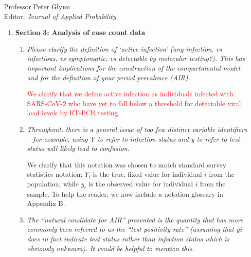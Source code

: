 \documentclass[11pt]{letter} %
\begin{document}
\begin{letter}{Professor
	Peter Glynn\\
	Editor, {\em Journal of Applied Probability}}
\begin{enumerate}
\begin{enumerate}
	The difference in age breakdown of sampled individuals in the Facebook / CMU survey, now referred to as Delphi's COVID-19 Trends and Impact Survey (CTIS), from the general population is acknowledged in Section 5.  Table 1 now presents estimates of all demographic and covariate information using Delphi CTIS's weighting procedure.  These weights are used in computing probabilities of selection as shown in Equation (4.2) in Section 4.1.1. Estimates for 'Fever' and 'Household + Case' only use data collected between April 25th and 29th to match the timing of the random survey.  Note that individual-level racial demographics were not provided by CTIS due to data privacy concerns and there was no corresponding question on percent of tests from individuals with a prior positive test.

	\vspace{5mm}
\end{enumerate}
\item {\bf Section 3: Analysis of case count data}
\begin{enumerate}
	\item {\it Please clarify the definition of ‘active infection’ (any infection, vs infectious, vs symptomatic, vs detectable by molecular testing?). This has important implications for the construction of the compartmental model and for the definition of your period prevalence (AIR).}
	\vspace{5mm}

	\textcolor{red}{We clarify that we define active infection as individuals infected with SARS-CoV-2 who have yet to fall below a threshold for detectable viral load levels by RT-PCR testing.}
	\vspace{5mm}
	\item {\it Throughout, there is a general issue of too few distinct variable identifiers – for example, using Y to refer to infection status and y to refer to test status will likely lead to confusion.}
	\vspace{5mm}

	We clarify that this notation was chosen to match standard survey statistics notation: $Y_i$ is the true, fixed value for individual $i$ from the population, while $y_i$ is the observed value for individual $i$ from the sample. To help the reader, we now include a notation glossary in Appendix B.
	\vspace{5mm}

	\item {\it The “natural candidate for AIR” presented is the quantity that has more commonly been referred to as the “test positivity rate” (assuming that yi does in fact indicate test status rather than infection status which is obviously unknown). It would be helpful to mention this.}
	\vspace{5mm}


\end{enumerate}
\end{enumerate}
\end{letter}
\end{document}
